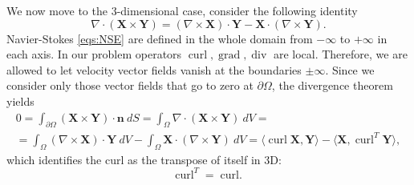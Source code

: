 \documentclass{article}
\numberwithin{equation}{section}
\begin{document}
We now move to the 3-dimensional case, consider the following identity
\begin{equation}
\nabla \cdot(\boldsymbol{X} \times \boldsymbol{Y})=(\nabla \times \boldsymbol{X}) \cdot \boldsymbol{Y}-\boldsymbol{X} \cdot(\nabla \times \boldsymbol{Y}).
\end{equation}
Navier-Stokes \cref{eqs:NSE} are defined in the whole domain from $-\infty$ to $+\infty$ in each axis. 
	In our problem operators $\operatorname{curl},\operatorname{grad},\operatorname{div}$ are local. 
	Therefore, we are allowed to let velocity vector fields vanish at the boundaries $\pm\infty$.
	Since we consider only those vector fields that go to zero at $\partial \Omega$, the divergence theorem yields
\begin{multline}
	0
	=	\int_{\partial \Omega}(\boldsymbol{X} \times \boldsymbol{Y}) \cdot \boldsymbol{n}\ dS
	=\int_{\Omega} \nabla \cdot(\boldsymbol{X} \times \boldsymbol{Y})\ dV=\\
	=\int_{\Omega} \left(\nabla \times \boldsymbol{X}\right)\cdot \boldsymbol{Y}\ dV
		-\int_{\Omega} \boldsymbol{X} \cdot \left(\nabla \times \boldsymbol{Y}\right)\ dV
	=\langle \operatorname{curl}\boldsymbol{X},\boldsymbol{Y}\rangle-\langle \boldsymbol{X},\operatorname{curl}^T\boldsymbol{Y}\rangle ,
\end{multline}
which identifies the curl as the transpose of itself in 3D:
\begin{equation}\label{eqn:curl-curl-orth}
\operatorname{curl}^T=\operatorname{curl.}	
\end{equation}


\pagebreak
\end{document}
